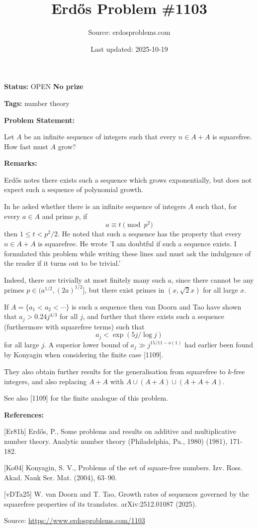 \documentclass{article}
\title{Erd\H{o}s Problem \#1103}
\date{Last updated: 2025-10-19}
\author{Source: erdosproblems.com}
\begin{document}
\maketitle

\noindent\textbf{Status:} OPEN \quad \textbf{No prize}

\noindent\textbf{Tags:} number theory

\medskip
\noindent\textbf{Problem Statement:}

Let $A$ be an infinite sequence of integers such that every $n\in A+A$ is squarefree. How fast must $A$ grow?

\bigskip
\noindent\textbf{Remarks:}

Erd\H{o}s notes there exists such a sequence which grows exponentially, but does not expect such a sequence of polynomial growth.

In \cite{Er81h} he asked whether there is an infinite sequence of integers $A$ such that, for every $a\in A$ and prime $p$, if\[a\equiv t\pmod{p^2}\]then $1\leq t<p^2/2$. He noted that such a sequence has the property that every $n\in A+A$ is squarefree. He wrote 'I am doubtful if such a sequence exists. I formulated this problem while writing these lines and must ask the indulgence of the reader if it turns out to be trivial.'

Indeed, there are trivially at most finitely many such $a$, since there cannot be any primes $p\in (a^{1/2},(2a)^{1/2}]$, but there exist primes in $(x,\sqrt{2}x)$ for all large $x$.

If $A=\{a_1<a_2<\cdots\}$ is such a sequence then van Doorn and Tao \cite{vDTa25} have shown that $a_j > 0.24j^{4/3}$ for all $j$, and further that there exists such a sequence (furthermore with squarefree terms) such that\[a_j < \exp(5j/\log j)\]for all large $j$. A superior lower bound of $a_j \gg j^{15/11-o(1)}$ had earlier been found by Konyagin \cite{Ko04} when considering the finite case [1109].

They also obtain further results for the generalisation from squarefree to $k$-free integers, and also replacing $A+A$ with $A\cup (A+A)\cup(A+A+A)$. 

See also [1109] for the finite analogue of this problem.

\bigskip
\noindent\textbf{References:}

[Er81h] Erd\H{o}s, P., Some problems and results on additive and multiplicative
number theory. Analytic number theory (Philadelphia, Pa., 1980) (1981), 171-182.
 
 [Ko04] Konyagin, S. V., Problems of the set of square-free numbers. Izv. Ross. Akad. Nauk Ser. Mat. (2004), 63--90.
 
 [vDTa25] W. van Doorn and T. Tao, Growth rates of sequences governed by the squarefree properties of its translates. arXiv:2512.01087 (2025).

\bigskip
\noindent\small{Source: \url{https://www.erdosproblems.com/1103}}
\end{document}
